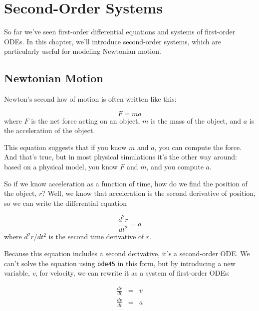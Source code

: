 \chapter{Second-Order Systems}


So far we've seen first-order differential equations and systems of first-order ODEs.  In this chapter, we'll introduce second-order systems, which are particularly useful for modeling Newtonian motion.


\section{Newtonian Motion}
\label{s:newton}

Newton's second law of motion is often written like this:

\begin{equation*}
    F = m a
\end{equation*}
where $F$ is the net force acting on an object, $m$ is the
mass of the object, and $a$ is the acceleration of the object.

This equation suggests
that if you know $m$ and $a$, you can compute the force. And that's true,
but in most physical simulations it's the other way around: based on a
physical model, you know $F$ and $m$, and you compute $a$.


So if we know acceleration as a function of time, how do we
find the position of the object, $r$?  Well, we know that acceleration
is the second derivative of position, so we can write the differential
equation

\begin{equation*}
    \frac{d^2r}{dt^2} = a
\end{equation*}
where ${d^2r}/{dt^2}$ is the second time derivative of $r$.

Because this equation includes a second derivative, it's
a second-order ODE.  We can't solve the equation using \lstinline{ode45} in this form, but
by introducing a new variable, \emph{v}, for velocity, we can rewrite it
as a system of first-order ODEs:

\begin{eqnarray*}
    \frac{dr}{dt} &=& v   \\
    \frac{dv}{dt} &=& a
\end{eqnarray*}

